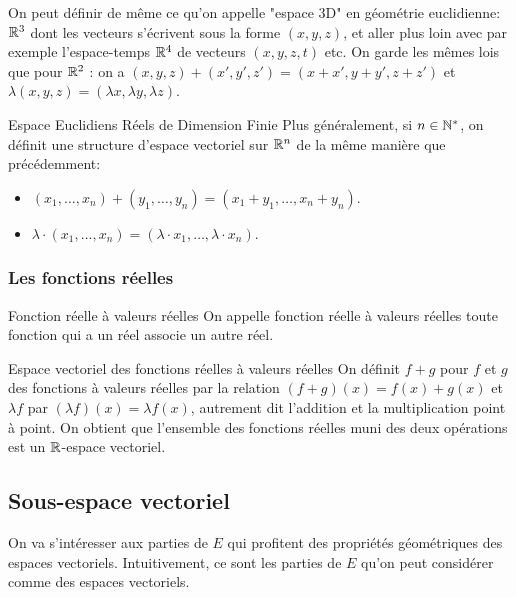 \documentclass{classe}
\begin{document}
On peut définir de même ce qu'on appelle "espace 3D" en géométrie euclidienne: $\mathbb{R}^3$ dont les vecteurs s'écrivent sous la forme $(x, y, z)$, et aller plus loin avec par exemple l'espace-temps $\mathbb{R}^4$ de vecteurs $(x, y, z, t)$ etc. On garde les mêmes lois que pour $\mathbb{R}^2$ : on a $(x, y, z) + (x', y', z') = (x+x', y+y', z+z')$ et $\lambda(x, y, z) = (\lambda x, \lambda y, \lambda z)$.

\begin{définition}{Espace Euclidiens Réels de Dimension Finie}{}
	Plus généralement, si $n \in \mathbb{N}^{*}$, on définit une structure d'espace vectoriel sur $\mathbb{R}^{n}$ de la même manière que précédemment:
	\begin{itemize}
		\item $\left( x_{1}, \ldots, x_{n} \right) + \left( y_{1}, \ldots, y_{n} \right) = \left( x_{1} + y_{1}, \ldots, x_{n} + y_{n} \right)$.
		\item $\lambda \cdot \left( x_{1}, \ldots, x_{n} \right) = \left( \lambda \cdot x_{1}, \ldots, \lambda \cdot x_{n} \right)$.
	\end{itemize}
\end{définition}

\subsubsection{Les fonctions réelles}

\begin{définition}{Fonction réelle à valeurs réelles}{}
On appelle fonction réelle à valeurs réelles toute fonction qui a un réel associe un autre réel.
\end{définition}

\begin{théorème}{Espace vectoriel des fonctions réelles à valeurs réelles}{}
	On définit $f+g$ pour $f$ et $g$ des fonctions à valeurs réelles par la relation $(f+g)(x) = f(x)+g(x)$ et $\lambda f$ par $(\lambda f)(x) = \lambda f(x)$, autrement dit l'addition et la multiplication point à point.
	On obtient que l'ensemble des fonctions réelles muni des deux opérations est un $\mathbb{R}$-espace vectoriel.
\end{théorème}

\subsection{Sous-espace vectoriel}

On va s'intéresser aux parties de $E$ qui profitent des propriétés géométriques des espaces vectoriels. Intuitivement, ce sont les parties de $E$ qu'on peut considérer comme des espaces vectoriels.
\end{document}
